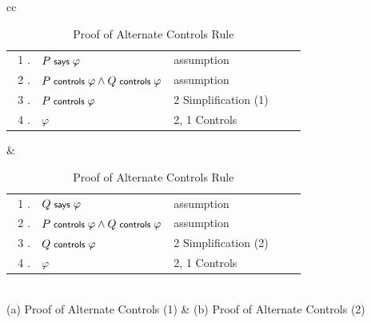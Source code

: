 \documentclass[10pt,twoside]{article}
\begin{document}
\begin{table}[t]
  \centering
  \begin{tabular}{cc}
  \begin{minipage}{0.48\linewidth}
    \begin{center}
      \begin{tabular}{|r<{.}>{$}p{0.45\linewidth}<{$}l|}
        \hline
        1 & P \says \varphi & assumption\\
        2 & P \controls \varphi \wedge Q \controls \varphi & assumption\\
        3 & P \controls \varphi & 2 Simplification (1)\\
        4 & \varphi & 2, 1 Controls\\
        \hline
      \end{tabular}
    \end{center}
  \end{minipage}
    &
    \begin{minipage}{0.48\linewidth}
      \begin{center}
        \begin{tabular}{|r<{.}>{$}p{0.45\linewidth}<{$}l|}
          \hline
          1 & Q \says \varphi & assumption\\
          2 & P \controls \varphi \wedge Q \controls \varphi & assumption\\
          3 & Q \controls \varphi & 2 Simplification (2)\\
          4 & \varphi & 2, 1 Controls\\
          \hline
        \end{tabular}
      \end{center}
  \end{minipage}\\
  (a) Proof of Alternate Controls (1) & (b) Proof of Alternate Controls (2)
\end{tabular}
  \caption{Proof of Alternate Controls Rule}
  \label{tab:alternate-controls-proof}
\end{table}

\end{document}
